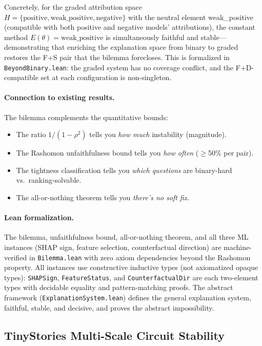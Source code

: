 \documentclass{article}
\begin{document}
Concretely, for the graded attribution space $H = \{\text{positive}, \text{weak\_positive}, \text{negative}\}$ with the neutral element weak\_positive (compatible with both positive and negative models' attributions), the constant method $E(\theta) = \text{weak\_positive}$ is simultaneously faithful and stable---demonstrating that enriching the explanation space from binary to graded restores the F+S pair that the bilemma forecloses. This is formalized in \texttt{BeyondBinary.lean}: the graded system has no coverage conflict, and the F+D-compatible set at each configuration is non-singleton.

\paragraph{Connection to existing results.}
The bilemma complements the quantitative bounds:
\begin{itemize}
\item The ratio $1/(1{-}\rho^2)$ tells you \textit{how much} instability (magnitude).
\item The Rashomon unfaithfulness bound tells you \textit{how often} ($\geq$50\% per pair).
\item The tightness classification tells you \textit{which questions} are binary-hard vs.\ ranking-solvable.
\item The all-or-nothing theorem tells you \textit{there's no soft fix}.
\end{itemize}

\paragraph{Lean formalization.}
The bilemma, unfaithfulness bound, all-or-nothing theorem, and all three ML instances (SHAP sign, feature selection, counterfactual direction) are machine-verified in \texttt{Bilemma.lean} with zero axiom dependencies beyond the Rashomon property.
All instances use constructive inductive types (not axiomatized opaque types): \texttt{SHAPSign}, \texttt{FeatureStatus}, and \texttt{CounterfactualDir} are each two-element types with decidable equality and pattern-matching proofs.
The abstract framework (\texttt{ExplanationSystem.lean}) defines the general explanation system, faithful, stable, and decisive, and proves the abstract impossibility.

\subsection{TinyStories Multi-Scale Circuit Stability}
\label{sec:tinystories}
\end{document}
